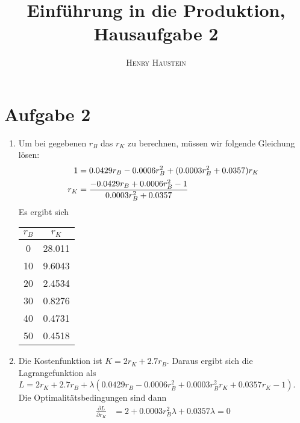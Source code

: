 \documentclass{article}
\title{\textbf{Einführung in die Produktion, Hausaufgabe 2}}
\author{\textsc{Henry Haustein}}
\date{}
\begin{document}
	\maketitle
	
	\section*{Aufgabe 2}
	\begin{enumerate}[label=(\alph*)]
		\item Um bei gegebenen $r_B$ das $r_K$ zu berechnen, müssen wir folgende Gleichung lösen:
		\begin{align}
			1 &= 0.0429r_B - 0.0006r_B^2 + (0.0003r_B^2 + 0.0357)r_K \notag \\
			r_K &= \frac{-0.0429r_B + 0.0006r_B^2-1}{0.0003r_B^2 + 0.0357} \notag
		\end{align}
		Es ergibt sich
		\begin{center}
			\begin{tabular}{c|c}
				$r_B$ & $r_K$ \\
				\hline
				0 & 28.011 \\
				10 & 9.6043 \\
				20 & 2.4534 \\
				30 & 0.8276 \\
				40 & 0.4731 \\
				50 & 0.4518
			\end{tabular}
		\end{center}
		\begin{center}
		\end{center}
		\item Die Kostenfunktion ist $K=2r_K + 2.7r_B$. Daraus ergibt sich die Lagrangefunktion als $L=2r_K + 2.7r_B + \lambda(0.0429r_B - 0.0006r_B^2 + 0.0003r_B^2r_K + 0.0357 r_K - 1)$. Die Optimalitätsbedingungen sind dann
		\begin{align}
			\frac{\partial L}{\partial r_K} &= 2 + 0.0003r_B^2\lambda + 0.0357\lambda = 0 \\

\end{align}
\end{enumerate}
\end{document}
